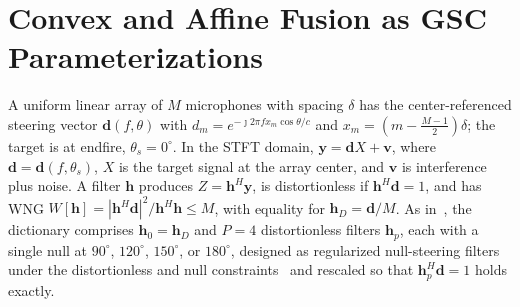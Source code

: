 \documentclass[journal]{IEEEtran}
\begin{document}
\section{Convex and Affine Fusion as GSC Parameterizations}
\label{sec:model}
A uniform linear array of $M$ microphones with spacing $\delta$ has the center-referenced steering vector $\mathbf d(f,\theta)$ with $d_m=e^{-\jmath2\pi fx_m\cos\theta/c}$ and $x_m=(m-\frac{M-1}{2})\delta$; the target is at endfire, $\theta_s=0^\circ$. In the STFT domain, $\mathbf y=\mathbf dX+\mathbf v$, where $\mathbf d=\mathbf d(f,\theta_s)$, $X$ is the target signal at the array center, and $\mathbf v$ is interference plus noise. A filter $\mathbf h$ produces $Z=\mathbf h^H\mathbf y$, is distortionless if $\mathbf h^H\mathbf d=1$, and has WNG $W[\mathbf h]=|\mathbf h^H\mathbf d|^2/\mathbf h^H\mathbf h\le M$, with equality for $\mathbf h_D=\mathbf d/M$. As in~\cite{qian2026beamfusion}, the dictionary comprises $\mathbf h_0=\mathbf h_D$ and $P=4$ distortionless filters $\mathbf h_p$, each with a single null at $90^\circ$, $120^\circ$, $150^\circ$, or $180^\circ$, designed as regularized null-steering filters under the distortionless and null constraints~\cite{chen2014dma} and rescaled so that $\mathbf h_p^H\mathbf d=1$ holds exactly.
\end{document}
